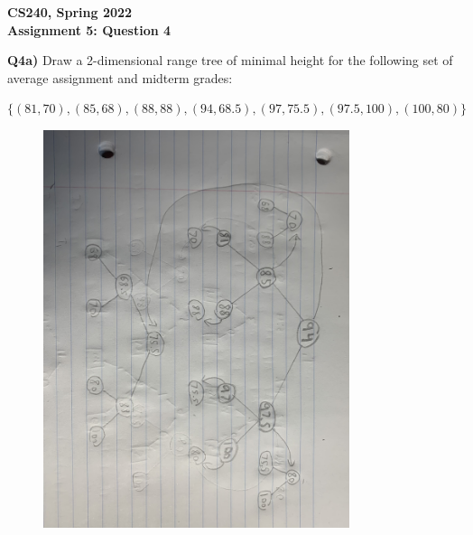 \documentclass[12pt]{article}
\begin{document}
\begin{center}
{\Large\textbf{CS240, Spring 2022}}\\
\vspace{2mm}
{\Large\textbf{Assignment 5: Question 4}}\\
\vspace{3mm}
\end{center}

\begin{adjustwidth}{0em}{0pt}
\textbf{Q4a)} Draw a 2-dimensional range tree of minimal height for the following set of average assignment and midterm grades:
\begin{center}
		$\{(81, 70), (85, 68), (88, 88), (94, 68.5), (97, 75.5), (97.5, 100), (100, 80)\}$ 
\end{center}

\begin{figure}[tbhp]
	\begin{center}
		\includegraphics[width=0.8\textwidth, angle=90]{p1.jpg}
	\end{center}
\end{figure}
\end{adjustwidth} 
\newpage
\end{document}
